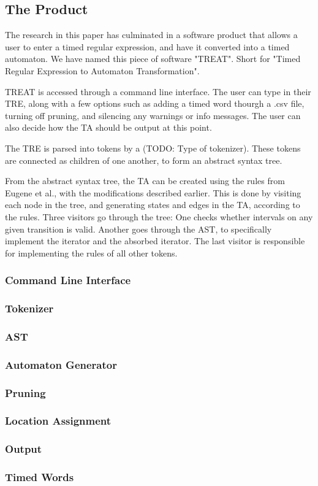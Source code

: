 \subsection{The Product}\label{subsec:theProduct}
The research in this paper has culminated in a software product that allows a user to enter a timed regular expression, and have it converted into a timed automaton.
We have named this piece of software "TREAT". Short for "Timed Regular Expression to Automaton Transformation".

TREAT is accessed through a command line interface. The user can type in their TRE, along with a few options such as adding a timed word thourgh a .csv file, turning off pruning, and silencing any warnings or info messages.
The user can also decide how the TA should be output at this point.

The TRE is parsed into tokens by a (TODO: Type of tokenizer). These tokens are connected as children of one another, to form an abstract syntax tree. 

From the abstract syntax tree, the TA can be created using the rules from Eugene et al., with the modifications described earlier. %
This is done by visiting each node in the tree, and generating states and edges in the TA, according to the rules. Three visitors go through the tree: One checks whether intervals on any given transition is valid. Another goes through the AST, to specifically implement the iterator and the absorbed iterator. The last visitor is responsible for implementing the rules of all other tokens.



\subsubsection{Command Line Interface}

\subsubsection{Tokenizer}

\subsubsection{AST}

\subsubsection{Automaton Generator}

\subsubsection{Pruning}

\subsubsection{Location Assignment}

\subsubsection{Output}

\subsubsection{Timed Words}
